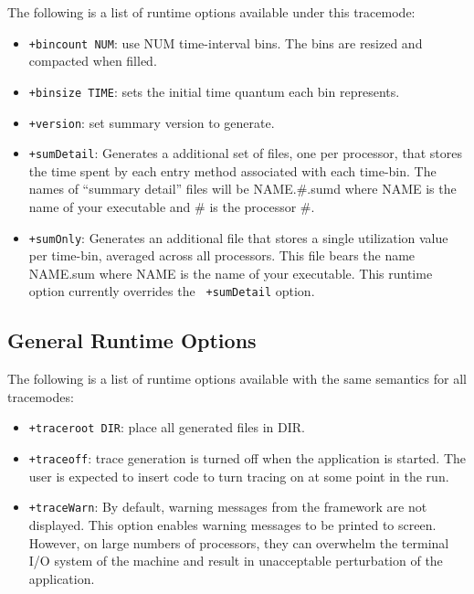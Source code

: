 \documentclass[10pt]{article}
\begin{document}
The following is a list of runtime options available under this tracemode:

\begin{itemize}
\item
{\tt +bincount NUM}:   use NUM time-interval bins. The bins are resized and compacted when filled.
\item
{\tt +binsize TIME}:   sets the initial time quantum each bin represents.
\item
{\tt +version}:        set summary version to generate.
\item
{\tt +sumDetail}: Generates a additional set of files, one per processor,
that stores the time spent by each entry method associated with each 
time-bin. The names of ``summary detail'' files will be NAME.\#.sumd where
NAME is the name of your executable and \# is the processor \#.
\item
{\tt +sumOnly}: Generates an additional file that stores a single
utilization value per time-bin, averaged across all processors. This
file bears the name NAME.sum where NAME is the name of your
executable. This runtime option currently overrides the {\tt
+sumDetail} option.
\end{itemize}

\subsection{General Runtime Options}
\label{sec::general options}

The following is a list of runtime options available with the same
semantics for all tracemodes:

\begin{itemize}
\item
{\tt +traceroot DIR}: place all generated files in DIR.
\item
{\tt +traceoff}: trace generation is turned off when the application
is started. The user is expected to insert code to turn tracing on at
some point in the run.
\item
{\tt +traceWarn}: By default, warning messages from the framework are
not displayed. This option enables warning messages to be printed to
screen. However, on large numbers of processors, they can overwhelm
the terminal I/O system of the machine and result in unacceptable
perturbation of the application.
\end{itemize}
\end{document}
